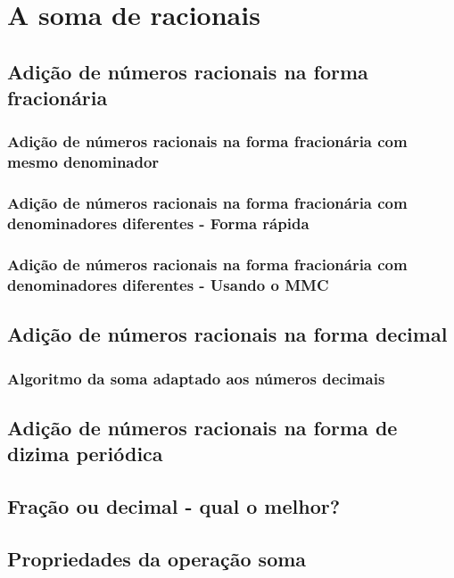 \chapter[A soma de racionais]{A soma de racionais}

\section{Adição de números racionais na forma fracionária}

\subsection{Adição de números racionais na forma fracionária com mesmo denominador}

\subsection{Adição de números racionais na forma fracionária com denominadores diferentes - Forma rápida}

\subsection{Adição de números racionais na forma fracionária com denominadores diferentes - Usando o MMC}

\section{Adição de números racionais na forma decimal}

\subsection{Algoritmo da soma adaptado aos números decimais}

\section{Adição de números racionais na forma de dizima periódica}

\section{Fração ou decimal - qual o melhor?}

\section{Propriedades da operação soma}

